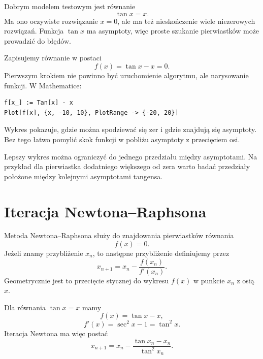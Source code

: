 Dobrym modelem testowym jest równanie
\begin{equation}
    \tan x=x.
\end{equation}
Ma ono oczywiste rozwiązanie \(x=0\), ale ma też nieskończenie wiele niezerowych rozwiązań. Funkcja \(\tan x\) ma asymptoty, więc proste szukanie pierwiastków może prowadzić do błędów.

Zapisujemy równanie w postaci
\begin{equation}
    f(x)=\tan x-x=0.
\end{equation}
Pierwszym krokiem nie powinno być uruchomienie algorytmu, ale narysowanie funkcji. W Mathematice:
\begin{verbatim}
f[x_] := Tan[x] - x
Plot[f[x], {x, -10, 10}, PlotRange -> {-20, 20}]
\end{verbatim}
Wykres pokazuje, gdzie można spodziewać się zer i gdzie znajdują się asymptoty. Bez tego łatwo pomylić skok funkcji w pobliżu asymptoty z przecięciem osi.

Lepszy wykres można ograniczyć do jednego przedziału między asymptotami. Na przykład dla pierwiastka dodatniego większego od zera warto badać przedziały położone między kolejnymi asymptotami tangensa.

\section{Iteracja Newtona--Raphsona}

Metoda Newtona--Raphsona służy do znajdowania pierwiastków równania
\begin{equation}
    f(x)=0.
\end{equation}
Jeżeli znamy przybliżenie \(x_n\), to następne przybliżenie definiujemy przez
\begin{equation}
    x_{n+1}=x_n-\frac{f(x_n)}{f'(x_n)}.
\end{equation}
Geometrycznie jest to przecięcie stycznej do wykresu \(f(x)\) w punkcie \(x_n\) z osią \(x\).

Dla równania \(\tan x=x\) mamy
\begin{equation}
    f(x)=\tan x-x,
\end{equation}
\begin{equation}
    f'(x)=\sec^2 x-1=\tan^2 x.
\end{equation}
Iteracja Newtona ma więc postać
\begin{equation}
    x_{n+1}=x_n-\frac{\tan x_n-x_n}{\tan^2 x_n}.
\end{equation}

